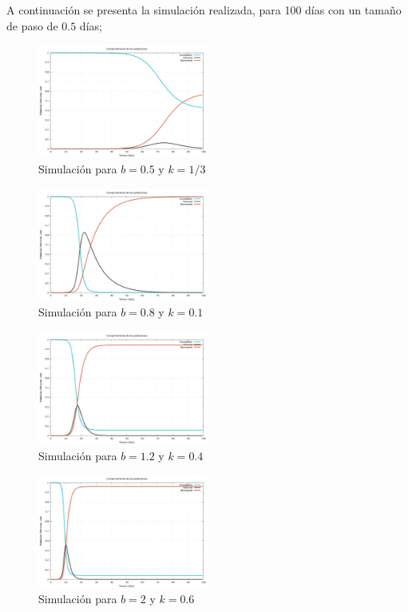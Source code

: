 \documentclass[journal]{IEEEtran}
\begin{document}
A continuación se presenta la simulación realizada, para 100 días con un tamaño de paso de $0.5$ días;
\begin{figure}[H]
	\centering
	\includegraphics[width=0.5\textwidth]{SIR/graph-1-SIR}
	\caption{Simulación para $b=0.5$ y $k=1/3$}
	\label{simulacion1}
\end{figure}
\begin{figure}[H]
	\centering
	\includegraphics[width=0.5\textwidth]{SIR/graph-2-SIR}
	\caption{Simulación para $b=0.8$ y $k=0.1$}
	\label{simulacion2}
\end{figure}
\begin{figure}[H]
	\centering
	\includegraphics[width=0.5\textwidth]{SIR/graph-3-SIR}
	\caption{Simulación para $b=1.2$ y $k=0.4$}
	\label{simulacion3}
\end{figure}
\begin{figure}[H]
	\centering
	\includegraphics[width=0.5\textwidth]{SIR/graph-4-SIR}
	\caption{Simulación para $b=2$ y $k=0.6$}
	\label{simulacion4}
\end{figure}
\end{document}
